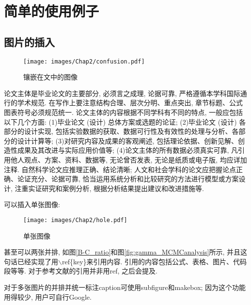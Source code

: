 \section{简单的使用例子}
\label{cha:example}
\subsection{图片的插入}
\label{sec:Images}
\begin{wrapfigure}{r}{0.5\linewidth}
\centering
\texttt{[image: images/Chap2/confusion.pdf]} %
\caption{镶嵌在文中的图像}
\label{fig:confusion}
\end{wrapfigure}
论文主体是毕业论文的主要部分, 必须言之成理, 论据可靠, 严格遵循本学科国际通行的学术规范. 在写作上要注意结构合理、层次分明、重点突出, 章节标题、公式图表符号必须规范统一. 论文主体的内容根据不同学科有不同的特点, 一般应包括以下几个方面: (1)毕业论文 (设计) 总体方案或选题的论证; (2)毕业论文 (设计) 各部分的设计实现, 包括实验数据的获取、数据可行性及有效性的处理与分析、各部分的设计计算等; (3)对研究内容及成果的客观阐述, 包括理论依据、创新见解、创造性成果及其改进与实际应用价值等; (4)论文主体的所有数据必须真实可靠, 凡引用他人观点、方案、资料、数据等, 无论曾否发表, 无论是纸质或电子版, 均应详加注释. 自然科学论文应推理正确、结论清晰; 人文和社会学科的论文应把握论点正确、论证充分、论据可靠, 恰当运用系统分析和比较研究的方法进行模型或方案设计, 注重实证研究和案例分析, 根据分析结果提出建议和改进措施等.

可以插入单张图像:
\begin{figure}[h]
\centering
\texttt{[image: images/Chap2/hole.pdf]}
\caption{单张图像}
\label{fig:hole}
\end{figure}

甚至可以两张并排, 如图\ref{B-C_ratio}和图\ref{fig:gamma_MCMCanalysis}所示, 并且这句话已经实现了用$\backslash$ref\{key\}来引用内容. 引用的内容包括公式、表格、图片、代码段等等. 对于参考文献的引用并非用ref, 之后会提及.

对于多张图片的并排并统一标注caption可使用subfigure和makebox; 因为这个功能用得较少, 用户可自行Google.

